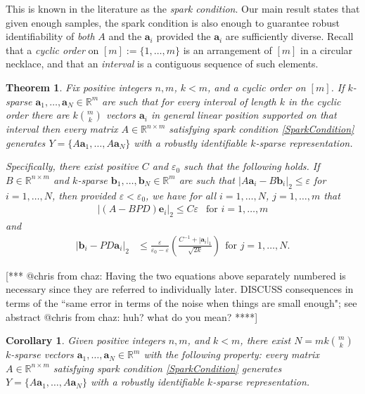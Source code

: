 \documentclass[journal, onecolumn]{IEEEtran}
\newtheorem{theorem}{Theorem}
\newtheorem{corollary}{Corollary}
\begin{document}
This is known in the literature as the \emph{spark condition}. Our main result states that given enough samples, the spark condition is also enough to guarantee robust identifiability of \emph{both} $A$ and the $\mathbf{a}_i$ provided the $\mathbf{a}_i$ are sufficiently diverse.  Recall that a \textit{cyclic order} on $[m] := \{1, \ldots,m\}$ is an arrangement of $[m]$ in a circular necklace, and that an \textit{interval} is a contiguous sequence of such elements. 

\begin{theorem}\label{DeterministicUniquenessTheorem}
Fix positive integers $n, m$, $k < m$, and a cyclic order on $[m]$. If $k$-sparse $\mathbf{a}_1, \ldots, \mathbf{a}_N \in \mathbb{R}^m$ are such that for every interval of length $k$ in the cyclic order there are $k{m \choose k}$ vectors $\mathbf{a}_i$ in general linear position supported on that interval then every matrix $A \in \mathbb{R}^{n \times m}$ satisfying spark condition \eqref{SparkCondition} generates $Y = \{A\mathbf{a}_1, \ldots, A\mathbf{a}_N\}$ with a robustly identifiable $k$-sparse representation.

Specifically, there exist positive $C$ and $\varepsilon_0$ such that the following holds. If $B \in \mathbb{R}^{n \times m}$ and $k$-sparse $\mathbf{b}_1, \ldots, \mathbf{b}_N \in \mathbb{R}^m$ are such that $|A\mathbf{a}_i - B\mathbf{b}_i|_2 \leq \varepsilon$ for $i = 1, \ldots, N$, then provided $\varepsilon < \varepsilon_0$, we have for all $i = 1, \ldots, N$, $j = 1, \ldots, m$  that
\begin{align}\label{Cstable}
|(A-BPD)\mathbf{e}_i|_2 \leq C\varepsilon \ \ \text{ for } i = 1, \ldots, m
\end{align}
and 
\begin{align}\label{b-PDa}
|\mathbf{b}_i - PD\mathbf{a}_i|_2 &\leq \frac{\varepsilon }{\varepsilon_0 - \varepsilon} \left( \frac{C^{-1}+|\mathbf{a}_i|_1}{ \sqrt{2k} } \right) \ \ \text{for } j = 1, \ldots, N.  
\end{align}
\end{theorem}

[*** @chris from chaz: Having the two equations above separately numbered is necessary since they are referred to individually later. DISCUSS consequences in terms of the ``same error in terms of the noise when things are small enough"; see abstract @chris from chaz: huh? what do you mean? ****]

\begin{corollary}\label{DeterministicUniquenessCorollary}
Given positive integers $n, m$, and $k < m$, there exist $N =  mk{m \choose k}$ $k$-sparse vectors $\mathbf{a}_1, \ldots, \mathbf{a}_N \in \mathbb{R}^m$ with the following property: every matrix $A \in \mathbb{R}^{n \times m}$ satisfying spark condition \eqref{SparkCondition} generates $Y = \{A\mathbf{a}_1, \ldots, A\mathbf{a}_N\}$ with a robustly identifiable $k$-sparse representation.
\end{corollary}
\end{document}
